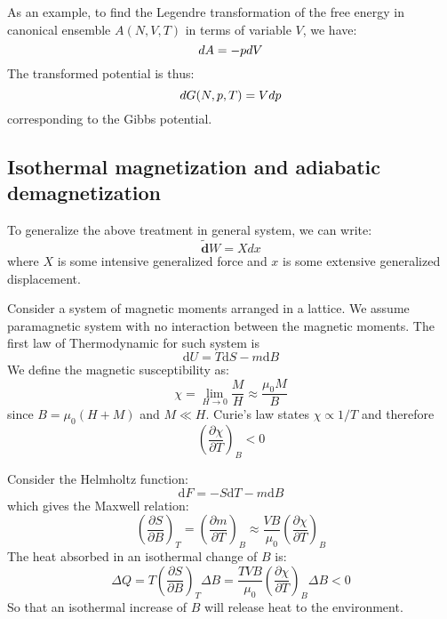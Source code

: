 \documentclass{article}
\newcommand{\pfrac}[2]{\frac{\partial #1}{\partial #2}}
\newcommand{\dbar}{\mathbf{\tilde{d}}}
\newcommand{\dnor}{\text{d}}
\begin{document}
As an example, to find the Legendre transformation of the free energy in canonical ensemble $A(N,V,T)$ in terms of 
variable $V$, we have:
\begin{equation}
    dA = -pdV \notag
\end{equation} 
The transformed potential is thus:
\begin{equation}
    dG(N,p,T) = Vdp \notag
\end{equation} 
corresponding to the 
Gibbs potential. 

\subsection{Isothermal magnetization and adiabatic demagnetization}
To generalize the above treatment in general system, we can write:
\begin{equation}
    \dbar W = X dx
\end{equation}
where $X$ is some intensive generalized force and $x$ is some 
extensive generalized displacement.

Consider a system of magnetic moments arranged in a lattice. We 
assume paramagnetic system with no interaction between the magnetic moments. 
The first law of Thermodynamic for such system is 
\begin{equation}
    \dnor U = T \dnor S - m \dnor B
\end{equation}
We define the magnetic susceptibility as:
\begin{equation}
    \chi = \lim_{H\to0} \frac{M}{H} \approx \frac{\mu_0 M}{B}
\end{equation}
since $B = \mu_0(H+M)$ and $M \ll H$.
Curie's law states $\chi \propto 1/T$ and therefore
\begin{equation}
    \left(\pfrac{\chi}{T}\right)_B < 0
\end{equation}

Consider the Helmholtz function:
\begin{equation}
    \dnor F = - S \dnor T - m \dnor B
\end{equation}
which gives the Maxwell relation:
\begin{equation}
    \left(\pfrac{S}{B}\right)_T = \left(\pfrac{m}{T}\right)_B 
    \approx \frac{VB}{\mu_0} \left(\pfrac{\chi}{T}\right)_B
\end{equation}
The heat absorbed in an isothermal change of $B$ is:
\begin{equation}
    \Delta Q = T \left(\pfrac{S}{B}\right)_T \Delta B
    = \frac{TVB}{\mu_0} \left(\pfrac{\chi}{T}\right)_B \Delta B < 0
\end{equation}
So that an isothermal increase of $B$ will 
release heat to the environment.
\end{document}
